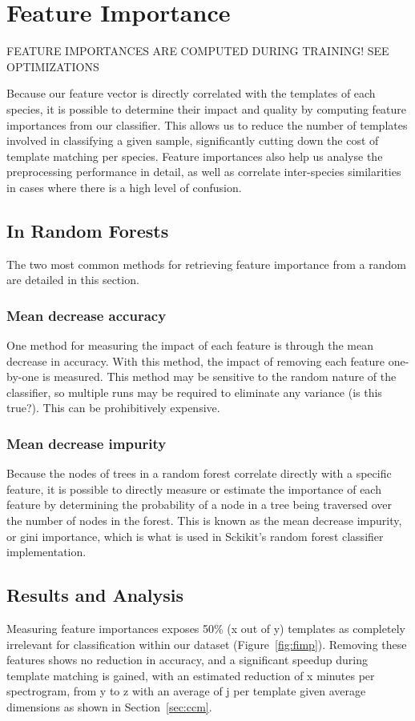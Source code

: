 \section{Feature Importance}\label{sec:feature_imp}

FEATURE IMPORTANCES ARE COMPUTED DURING TRAINING! SEE OPTIMIZATIONS

Because our feature vector is directly correlated with the templates of each species,
it is possible to determine their impact and quality by computing feature
importances from our classifier.
This allows us to reduce the number of templates involved in classifying a given
sample, significantly cutting down the cost of template matching per species.
Feature importances also help us analyse the preprocessing performance in detail,
as well as correlate inter-species similarities in cases where there is a high
level of confusion.

\subsection{In Random Forests}

The two most common methods for retrieving feature importance from a random
are detailed in this section.

\subsubsection{Mean decrease accuracy}
One method for measuring the impact of each feature is through the mean decrease
in accuracy.
With this method, the impact of removing each feature one-by-one is measured.
This method may be sensitive to the random nature of the classifier, so multiple
runs may be required to eliminate any variance (is this true?).
This can be prohibitively expensive.

\subsubsection{Mean decrease impurity}
Because the nodes of trees in a random forest correlate directly with a specific
feature, it is possible to directly measure or estimate the importance of each
feature by determining the probability of a node in a tree being traversed over 
the number of nodes in the forest.
This is known as the mean decrease impurity, or gini importance, which is what
is used in Sckikit's random forest classifier implementation.

\subsection{Results and Analysis}\label{sec:template_analysis}
Measuring feature importances exposes 50\% (x out of y) templates as 
completely irrelevant for classification within our dataset
(Figure~\ref{fig:fimp}).
Removing these features shows no reduction in accuracy, and a significant speedup
during template matching is gained, with an estimated reduction of x minutes per
spectrogram, from y to z with an average of j per template given average
dimensions as shown in Section~\ref{sec:ccm}.

